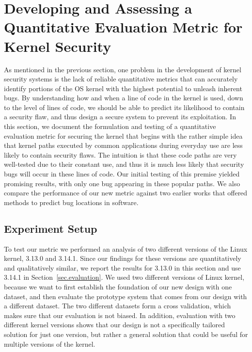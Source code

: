 \section{Developing and Assessing a Quantitative Evaluation Metric for Kernel Security}
\label{sec.metric}

As mentioned in the previous section, one problem in the development of kernel
security systems is the lack of reliable quantitative metrics that
can accurately identify portions of the OS kernel with the highest potential
to unleash inherent bugs. By understanding how and when
a line of code in the kernel is used, down to the level of lines of code, we
should be able to predict its likelihood to contain a security flaw, and thus
design a secure system to prevent its exploitation.
In this section, we document the formulation and testing
of a quantitative evaluation metric for securing the kernel that begins with the
rather simple idea that kernel paths executed by common applications
during everyday use are less likely to contain security flaws. The intuition
is that these code paths are very well-tested due to their constant use, and
thus it is much less likely that security bugs will occur in these lines of code.
Our initial testing of this premise yielded promising results, with only one
bug appearing in these popular paths.  We also compare the performance of our
new metric against two earlier works that offered methods to predict bug
locations in software.

\subsection{Experiment Setup}
To test our metric we performed an analysis of two different versions of
the Linux kernel, 3.13.0 and 3.14.1. Since our findings for these
versions are quantitatively and qualitatively similar, we report
the results for 3.13.0 in this section and use 3.14.1 in Section~\ref{sec.evaluation}. 
We used two different versions of Linux kernel, because we want to first establish 
the foundation of our new design with one dataset, and then evaluate the prototype 
system that comes from our design with a different dataset. The two different datasets 
form a cross validation, which makes sure that our evaluation is not biased. In addition, 
evaluation with two different kernel versions shows that our design is not a specifically 
tailored solution for just one version, but rather a general solution that could be useful 
for multiple versions of the kernel. 


